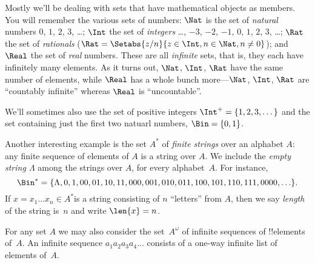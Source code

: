 \documentclass[../../include/open-logic-section]{subfiles}
\begin{document}

\begin{ex}
Mostly we'll be dealing with sets that have mathematical objects as
members. You will remember the various sets of numbers: $\Nat$
is the set of \emph{natural} numbers $0$, $1$, $2$, $3$, \dots{};
$\Int$ the set of \emph{integers} \ldots{}, $-3$, $-2$,
$-1$, $0$, $1$, $2$, $3$, \ldots{}; $\Rat$ the set of
\emph{rationals} ($\Rat = \Setabs{z/n}{z \in \Int, n \in \Nat, n \neq 0}$); and
$\Real$ the set of \emph{real} numbers. These are all \emph{infinite}
sets, that is, they each have infinitely many elements. As it turns
out, $\Nat$, $\Int$, $\Rat$ have the same number
of elements, while $\Real$ has a whole bunch more---$\Nat$,
$\Int$, $\Rat$ are ``countably infinite'' whereas
$\Real$ is ``uncountable''.

We'll sometimes also use the set of positive integers $\Int^+ = \{1,
2, 3, \dots\}$ and the set containing just the first two natuarl
numbers, $\Bin = \{0, 1\}$.
\end{ex}

\begin{ex}[Strings]
Another interesting example  is the set $A^{*}$ of
\emph{finite strings} over an alphabet $A$: any finite sequence of elements of
$A$ is a string over $A$. We include the \emph{empty string $\Lambda$}
among the strings over $A$, for every alphabet~$A$. For instance,
\[
\Bin^*
=\{\Lambda,0,1,00,01,10,11,000,001,010,011,100,101,110,111,0000,\ldots\}.
\]
If $x=x_{1}\ldots x_{n}\in A^{*}$is a string consisting of $n$
``letters'' from $A$, then we say \emph{length} of the string is~$n$
and write $\len{x}=n$.
\end{ex}

\begin{ex}
For any set $A$ we may also consider the set~$A^\omega$ of infinite
sequences of !!{element}s of~$A$. An infinite sequence
$a_1a_2a_3a_4\dots$ consists of a one-way infinite list of elements
of~$A$.
\end{ex}
\end{document}
